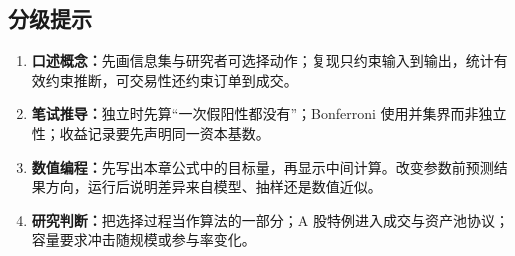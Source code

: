 \subsection*{分级提示}
\begingroup\small
\begin{enumerate}[nosep,leftmargin=*]
  \item \textbf{口述概念：}先画信息集与研究者可选择动作；复现只约束输入到输出，统计有效约束推断，可交易性还约束订单到成交。
  \item \textbf{笔试推导：}独立时先算“一次假阳性都没有”；Bonferroni 使用并集界而非独立性；收益记录要先声明同一资本基数。
  \item \textbf{数值编程：}先写出本章公式中的目标量，再显示中间计算。改变参数前预测结果方向，运行后说明差异来自模型、抽样还是数值近似。
  \item \textbf{研究判断：}把选择过程当作算法的一部分；A 股特例进入成交与资产池协议；容量要求冲击随规模或参与率变化。
\end{enumerate}
\endgroup
